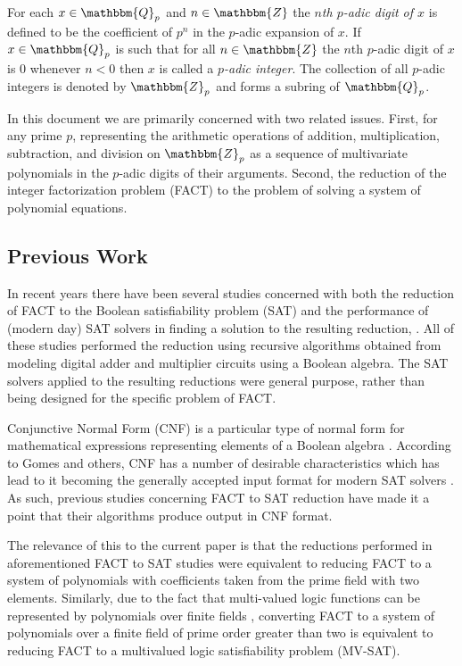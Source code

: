 \documentclass{article}
\newcommand{\Z}{\mathbbm{Z}}
\newcommand{\Q}{\mathbbm{Q}}
\theoremstyle{theorem}
\theoremstyle{definition}
\theoremstyle{definition}
\begin{document}
For each $x \in \Q_p$ and $n \in \Z$ the \textit{$n$th $p$-adic digit of $x$} is defined to be the coefficient of $p^n$ in the $p$-adic expansion of $x$. If $x \in \Q_p$ is such that for all $n \in \Z$ the $n$th $p$-adic digit of $x$ is $0$ whenever $n<0$ then $x$ is called a \textit{$p$-adic integer}. The collection of all $p$-adic integers is denoted by $\Z_p$ and forms a subring of $\Q_p$. 

In this document we are primarily concerned with two related issues. First, for any prime $p$, representing the arithmetic operations of addition, multiplication, subtraction, and division on $\Z_p$ as a sequence of multivariate polynomials in the $p$-adic digits of their arguments. Second, the reduction of the integer factorization problem (FACT) to the problem of solving a system of polynomial equations. 

\subsection{Previous Work}
In recent years there have been several studies concerned with both the reduction of FACT to the Boolean satisfiability problem (SAT) and the performance of (modern day) SAT solvers in finding a solution to the resulting reduction, \cite{Asketorp, Eriksson, Forsblom}. All of these studies performed the reduction using recursive algorithms obtained from modeling digital adder and multiplier circuits using a Boolean algebra. The SAT solvers applied to the resulting reductions were general purpose, rather than being designed for the specific problem of FACT. 

Conjunctive Normal Form (CNF) is a particular type of normal form for mathematical expressions representing elements of a Boolean algebra \cite{Gomes}. According to Gomes and others, CNF has a number of desirable characteristics which has lead to it becoming the generally accepted input format for modern SAT solvers \cite{Gomes}. As such, previous studies concerning FACT to SAT reduction have made it a point that their algorithms produce output in CNF format. 

The relevance of this to the current paper is that the reductions performed in aforementioned FACT to SAT studies were equivalent to reducing FACT to a system of polynomials with coefficients taken from the prime field with two elements. Similarly, due to the fact that multi-valued logic functions can be represented by polynomials over finite fields \cite{Carnielli2, Stankovic}, converting FACT to a system of polynomials over a finite field of prime order greater than two is equivalent to reducing FACT to a multivalued logic satisfiability problem (MV-SAT). 
\end{document}

